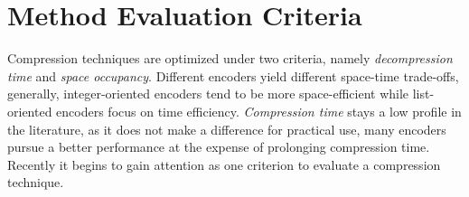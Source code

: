 \documentclass[runningheads,a4paper]{llncs}
\begin{document}
%		
%		

\section{Method Evaluation Criteria}\label{sec:III}

Compression techniques are optimized under two criteria, namely \textit{decompression time} and \textit{space occupancy}.
Different encoders yield different space-time trade-offs, generally, integer-oriented encoders tend to be more space-efficient while list-oriented encoders focus on time efficiency.
\textit{Compression time} stays a low profile in the literature, as it does not make a difference for practical use, many encoders pursue a better performance at the expense of prolonging compression time.
Recently it begins to gain attention as one criterion to evaluate a compression technique\cite{lemire2015decoding,ottaviano2015optimal}.
\end{document}
